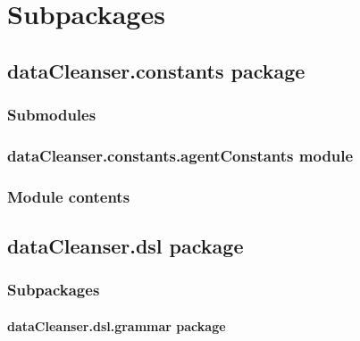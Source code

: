 \documentclass[letterpaper,10pt,english]{sphinxmanual}
\begin{document}
\section{Subpackages}
\label{dataCleanser:subpackages}

\subsection{dataCleanser.constants package}
\label{dataCleanser.constants:datacleanser-constants-package}\label{dataCleanser.constants::doc}

\subsubsection{Submodules}
\label{dataCleanser.constants:submodules}

\subsubsection{dataCleanser.constants.agentConstants module}
\label{dataCleanser.constants:datacleanser-constants-agentconstants-module}\label{dataCleanser.constants:module-dataCleanser.constants.agentConstants}

\subsubsection{Module contents}
\label{dataCleanser.constants:module-dataCleanser.constants}\label{dataCleanser.constants:module-contents}

\subsection{dataCleanser.dsl package}
\label{dataCleanser.dsl:datacleanser-dsl-package}\label{dataCleanser.dsl::doc}

\subsubsection{Subpackages}
\label{dataCleanser.dsl:subpackages}

\paragraph{dataCleanser.dsl.grammar package}
\label{dataCleanser.dsl.grammar:datacleanser-dsl-grammar-package}\label{dataCleanser.dsl.grammar::doc}
\end{document}
